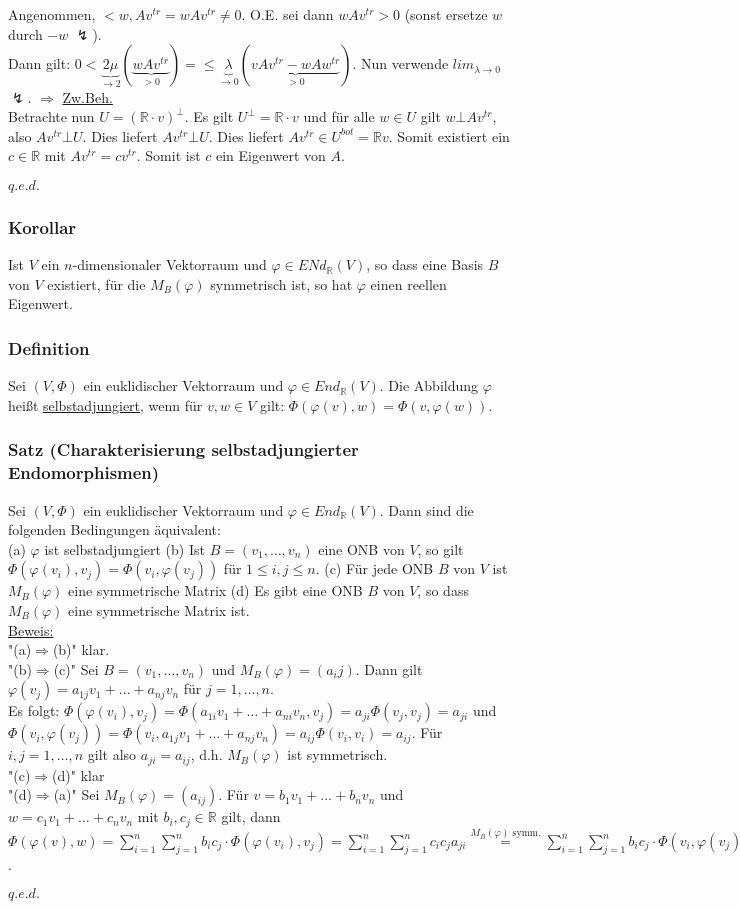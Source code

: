 \documentclass[a4paper]{article}
\newcommand{\ul}{\underline}
\renewcommand{\proof}{\ul{Beweis:}\\}
\renewcommand{\qed}{\begin{flushright}
\ul{\(q.e.d.\)}
\end{flushright}}
\let\phi\varphi
\begin{document}
Angenommen, \(<w,Av^{tr}=wAv^{tr}\neq 0\). O.E. sei dann \(wAv^{tr}>0\) (sonst ersetze \(w\) durch \(-w\) \(\lightning\)).\\
Dann gilt: \(0<\underbrace{2\mu}_{\rightarrow 2}(\underbrace{wAv^{tr}}_{>0})=\leq \underbrace{\lambda}_{\rightarrow 0} (\underbrace{vAv^{tr}-wAw^{tr}}_{>0})\). Nun verwende \(lim_{\lambda\rightarrow 0}\) \(\lightning\).
\(\Rightarrow \) \ul{Zw.Beh.}\\
Betrachte nun \(U=(\mathbb{R}\cdot v)^\bot\). Es gilt \(U^\bot=\mathbb{R}\cdot v\) und für alle \(w\in U\) gilt \(w\bot Av^{tr}\), also \(Av^{tr}\bot U\). Dies liefert \(Av^{tr}\bot U\). Dies liefert \(Av^{tr}\in U^{bot}=\mathbb{R}v\). Somit existiert ein \(c\in\mathbb{R}\) mit \(Av^{tr}=cv^{tr}\). Somit ist \(c\) ein Eigenwert von \(A\).
\qed
\subsubsection{Korollar}
Ist \(V\) ein \(n\)-dimensionaler Vektorraum und \(\phi\in ENd_\mathbb{R}(V)\), so dass eine Basis \(B\) von \(V\) existiert, für die \(M_B(\phi)\) symmetrisch ist, so hat \(\phi\) einen reellen Eigenwert.
\subsubsection{Definition}
Sei \((V,\Phi)\) ein euklidischer Vektorraum und \(\phi\in End_\mathbb{R}(V)\). Die Abbildung \(\phi\) heißt \ul{selbstadjungiert}, wenn für \(v,w\in V\) gilt: \(\Phi(\phi(v),w)=\Phi(v,\phi(w))\).
\subsubsection{Satz (Charakterisierung selbstadjungierter Endomorphismen)}
Sei \((V,\Phi)\) ein euklidischer Vektorraum und \(\phi\in End_\mathbb{R}(V)\). Dann sind die folgenden Bedingungen äquivalent:\\
(a) \(\phi\) ist selbstadjungiert
(b) Ist \(B=(v_1,\dots,v_n)\) eine ONB von \(V\), so gilt \(\Phi(\phi(v_i), v_j)=\Phi(v_i,\phi(v_j))\) für \(1\leq i,j\leq n\).
(c) Für jede ONB \(B\) von \(V\) ist \(M_B(\phi)\) eine symmetrische Matrix
(d) Es gibt eine ONB \(B\) von \(V\), so dass \(M_B(\phi)\) eine symmetrische Matrix ist.\\
\proof
"(a)\(\Rightarrow\)(b)" klar.\\
"(b)\(\Rightarrow\)(c)" Sei \(B=(v_1,\dots,v_n)\) und \(M_B(\phi)=(a_ij)\). Dann gilt \(\phi(v_j)=a_{1j}v_1+\dots+a_{nj}v_n\) für \(j=1,\dots,n\).\\
Es folgt: \(\Phi(\phi(v_i), v_j)=\Phi(a_{1i}v_1+\dots+a_{ni}v_n,v_j)=a_{ji}\Phi(v_j,v_j)=a_{ji}\) und \(\Phi(v_i,\phi(v_j))=\Phi(v_i,a_{1j}v_1+\dots+a_{nj}v_n)=a_{ij}\Phi(v_i,v_i)=a_{ij}\). Für \(i,j=1,\dots,n\) gilt also \(a_{ji}=a_{ij}\), d.h. \(M_B(\phi)\) ist symmetrisch.\\
"(c)\(\Rightarrow\)(d)" klar\\
"(d)\(\Rightarrow\)(a)" Sei \(M_B(\phi)=(a_{ij})\). Für \(v=b_1v_1+\dots+b_nv_n\) und \(w=c_1v_1+\dots+c_nv_n\) mit \(b_i,c_j\in\mathbb{R}\) gilt, dann \(\Phi(\phi(v),w)=\sum_{i=1}^n\sum_{j=1}^nb_ic_j\cdot \Phi(\phi(v_i),v_j)=\sum_{i=1}^n\sum_{j=1}^nc_ic_ja_{ji}\overset{M_B(\phi)\text{ symm.}}{=}\sum_{i=1}^n\sum_{j=1}^nb_ic_j\cdot \Phi(v_i,\phi(v_j))=\Phi(v,\phi(w))\).
\qed
\end{document}
